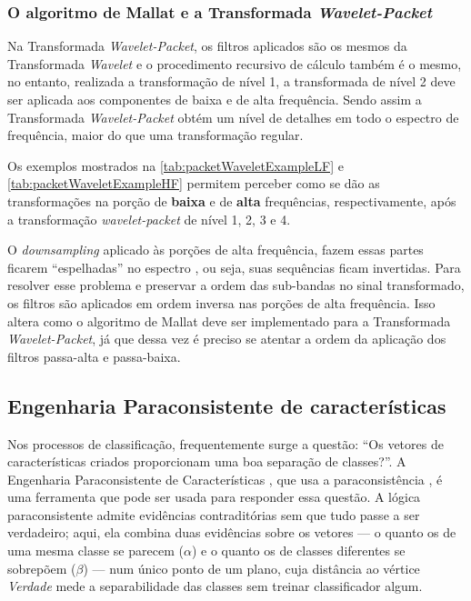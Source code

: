 			
	
		\subsubsection{O algoritmo de Mallat e a Transformada \textit{Wavelet-Packet}}
			\par Na Transformada \textit{Wavelet-Packet}, os filtros aplicados são os mesmos da Transformada \textit{Wavelet} e o procedimento recursivo de cálculo também é o mesmo, no entanto, realizada a transformação de nível 1, a transformada de nível 2 deve ser aplicada aos componentes de baixa e de alta frequência. Sendo assim a Transformada \textit{Wavelet-Packet} obtém um nível de detalhes em todo o espectro de frequência, maior do que uma transformação regular. 
			
			\par Os exemplos mostrados na \autoref{tab:packetWaveletExampleLF} e \autoref{tab:packetWaveletExampleHF} permitem perceber como se dão as transformações na porção de \textbf{baixa} e de \textbf{alta} frequências, respectivamente, após a transformação \textit{wavelet-packet} de nível 1, 2, 3 e 4.
			
			\par O \textit{downsampling} aplicado às porções de alta frequência, fazem essas partes ficarem ``espelhadas'' no espectro \cite{Jensen_2001}, ou seja, suas sequências ficam invertidas. Para resolver esse problema e preservar a ordem das sub-bandas no sinal transformado, os filtros são aplicados em ordem inversa nas porções de alta frequência. Isso altera como o algoritmo de Mallat deve ser implementado para a Transformada \textit{Wavelet-Packet}, já que dessa vez é preciso se atentar a ordem da aplicação dos filtros passa-alta e passa-baixa.
	
			
	
		\subsection{Engenharia Paraconsistente de características}
			\label{sec:analiseParaconsistente}
			\par Nos processos de classificação, frequentemente surge a questão: ``Os vetores de características criados proporcionam uma boa separação de classes?''. A Engenharia Paraconsistente de Características \cite{8588433}, que usa a paraconsistência \cite{da1998elementos,COSTA2000}, é uma ferramenta que pode ser usada para responder essa questão. A lógica paraconsistente admite evidências contraditórias sem que tudo passe a ser verdadeiro; aqui, ela combina duas evidências sobre os vetores --- o quanto os de uma mesma classe se parecem ($\alpha$) e o quanto os de classes diferentes se sobrepõem ($\beta$) --- num único ponto de um plano, cuja distância ao vértice \textit{Verdade} mede a separabilidade das classes sem treinar classificador algum.
			

